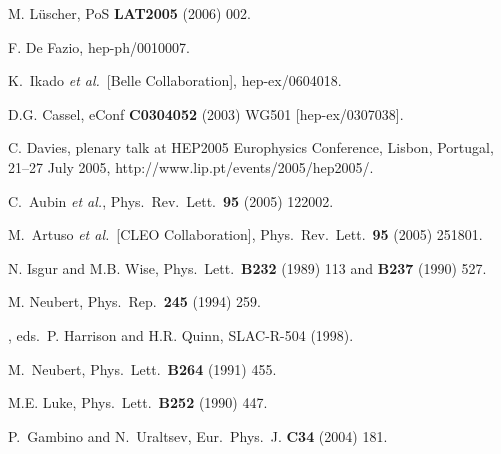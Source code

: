 \documentclass[12pt]{article}
\begin{document}
\begin{thebibliography}{999}
M. L\"uscher,
  PoS {\bf LAT2005} (2006) 002.

F. De Fazio,
hep-ph/0010007.

 K.~Ikado {\it et al.}~[Belle Collaboration],
  hep-ex/0604018.
  
D.G. Cassel,
eConf {\bf C0304052} (2003) WG501 [hep-ex/0307038].

C. Davies, plenary talk at HEP2005 Europhysics Conference, 
Lisbon, Portugal, 21--27 July 2005, http://www.lip.pt/events/2005/hep2005/.
  
 C.~Aubin {\it et al.},
  Phys.\ Rev.\ Lett.\  {\bf 95} (2005) 122002.

 M.~Artuso {\it et al.}\  [CLEO Collaboration],
  Phys.\ Rev.\ Lett.\  {\bf 95} (2005) 251801.

N. Isgur and M.B. Wise,
{ Phys.\ Lett.}~{\bf B232} (1989) 113 and
{\bf B237} (1990) 527.

M. Neubert, { Phys.\ Rep.}~{\bf 245} (1994) 259.

, eds.\ P. Harrison and
H.R. Quinn, SLAC-R-504 (1998).

M.~Neubert,
{ Phys.\ Lett.}~{\bf B264} (1991) 455.

M.E. Luke,
{ Phys.\ Lett.}~{\bf B252} (1990) 447.

  P.~Gambino and N.~Uraltsev,
  { Eur.\ Phys.\ J.} {\bf C34} (2004) 181.


\end{thebibliography}
\end{document}
